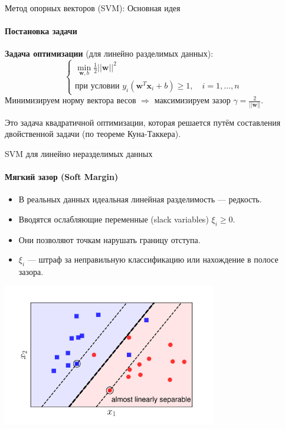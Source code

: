 \documentclass[notheorems, handout]{beamer}
\begin{document}
\begin{frame}{Метод опорных векторов (SVM): Основная идея}
  \framesubtitle{Постановка задачи}

  \textbf{Задача оптимизации} (для линейно разделимых данных):
  \[
    \begin{cases}
      \min_{\mathbf{w}, b} \frac{1}{2} ||\mathbf{w}||^2 \\
      \text{при условии } y_i (\mathbf{w}^T \mathbf{x}_i + b) \geq 1,
      \quad i = 1, \dots, n
    \end{cases}
  \]
  Минимизируем норму вектора весов $\Rightarrow$ \alert{максимизируем
  зазор} $\gamma = \frac{2}{||\mathbf{w}||}$.

  Это задача квадратичной оптимизации, которая решается путём
  составления двойственной задачи (по теореме Куна-Таккера).
\end{frame}

\begin{frame}{SVM для линейно неразделимых данных}
  \framesubtitle{Мягкий зазор (Soft Margin)}

  \begin{itemize}
    \item В реальных данных идеальная линейная разделимость — редкость.
    \item Вводятся \alert{ослабляющие переменные (slack variables)}
      $\xi_i \geq 0$.
    \item Они позволяют точкам нарушать границу отступа.
    \item $\xi_i$ — штраф за неправильную классификацию или
      нахождение в полосе зазора.
  \end{itemize}
  \begin{center}
    \includegraphics[width=0.7\textwidth]{img/soft_margin.png}
  \end{center}
\end{frame}
\end{document}
